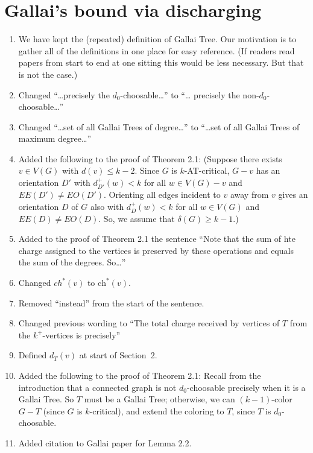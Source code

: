 \documentclass{article}
\newcommand{\ch}{\textrm{ch}}
\begin{document}
\section{Gallai's bound via discharging}
\begin{enumerate}
\item We have kept the (repeated) definition of Gallai Tree.  Our motivation is
to gather all of the definitions in one place for easy reference.  (If readers
read papers from start to end at one sitting this would be less necessary.  But
that is not the case.)
\item Changed ``\ldots precisely the $d_0$-choosable\ldots'' to ``\ldots
precisely the non-$d_0$-choosable\ldots''
\item Changed ``\ldots set of all Gallai Trees of degree\ldots'' to
``\ldots set of all Gallai Trees of maximum degree\ldots'' 
\item Added the following to the proof of Theorem 2.1:
(Suppose there exists $v\in V(G)$ with $d(v)\le k-2$. Since $G$ is
$k$-AT-critical, $G-v$ has an orientation $D'$ with $d^+_{D'}(w)<k$ for all
$w\in V(G)-v$ and $EE(D')\ne EO(D')$.  Orienting all edges incident to $v$ away
from $v$ gives an orientation $D$ of $G$ also with $d^+_D(w)<k$ for all $w\in
V(G)$ and $EE(D)\ne EO(D)$.  So, we assume that $\delta(G)\ge k-1$.)
\item Added to the proof of Theorem 2.1 the sentence ``Note that the sum of
hte charge assigned to the vertices is preserved by these operations and equals
the sum of the degrees. So\ldots''
\item Changed $ch^*(v)$ to $\ch^*(v)$.
\item Removed ``instead'' from the start of the sentence.
\item Changed previous wording to ``The total charge received by vertices of
$T$ from the $k^+$-vertices is precisely''
\item Defined $d_T(v)$ at start of Section~2.
\item Added the following to the proof of Theorem 2.1:
Recall from the introduction that a connected graph is not
$d_0$-choosable precisely when it is a Gallai Tree.  So $T$ must be a Gallai
Tree; otherwise, we can $(k-1)$-color $G-T$ (since $G$ is $k$-critical), and
extend the coloring to $T$, since $T$ is $d_0$-choosable.
\item Added citation to Gallai paper for Lemma 2.2.
\end{enumerate}
\end{document}
